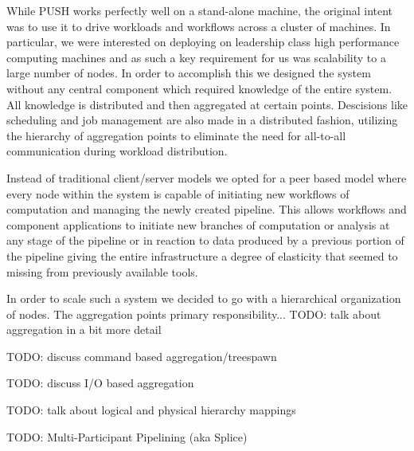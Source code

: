 While PUSH works perfectly well on a stand-alone machine, the original
intent was to use it to drive workloads and workflows across a cluster of
machines.  In particular, we were interested on deploying on leadership
class high performance computing machines and as such
a key requirement for us was scalability to a large number of nodes.  
In order to accomplish this we designed the system without any central
component which required knowledge of the entire system.
All knowledge is distributed and then aggregated at certain points.
Descisions like scheduling and job management are also made in a
distributed fashion, utilizing the hierarchy of aggregation points
to eliminate the need for all-to-all communication during workload
distribution.

Instead of traditional client/server models we opted for a peer based
model where every node within the system is capable of initiating new
workflows of computation and managing the newly created pipeline.
This allows workflows and component applications to initiate new branches
of computation or analysis at any stage of the pipeline or in reaction to
data produced by a previous portion of the pipeline giving the entire
infrastructure a degree of elasticity that seemed to missing from 
previously available tools.

In order to scale such a system we decided to go with a hierarchical
organization of nodes.  The aggregation points primary responsibility...
TODO: talk about aggregation in a bit more detail

TODO: discuss command based aggregation/treespawn

TODO: discuss I/O based aggregation

TODO: talk about logical and physical hierarchy mappings

TODO: Multi-Participant Pipelining (aka Splice)
